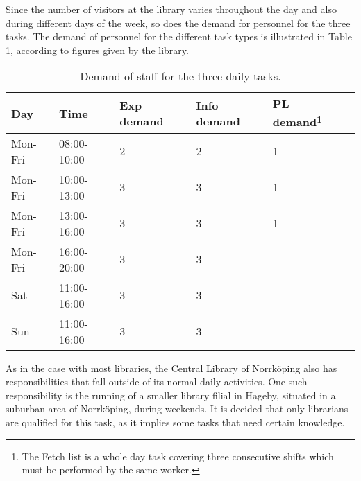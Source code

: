 Since the number of visitors at the library varies throughout the day and also during different days of the week, so does the demand for personnel for the three tasks. The demand of personnel for the different task types is illustrated in Table \ref{tab:Outer_Task_Demand}, according to figures given by the library. 



\begin{table}[h]
\centering
\caption{Demand of staff for the three daily tasks.}
\label{tab:Outer_Task_Demand}
\begin{tabularx}{\textwidth}{|X|l|l|l|l|X|}
\hline
\textbf{Day} & \textbf{Time} & \textbf{Exp demand} & \textbf{Info demand} & \textbf{PL demand\footnote{The Fetch list is a whole day task covering three consecutive shifts which must be performed by the same worker.}}
\\ \hline 
Mon-Fri & 08:00-10:00 & 2 & 2 & 1
\\ \hline 
Mon-Fri & 10:00-13:00 & 3 & 3 & 1
\\ \hline 
Mon-Fri & 13:00-16:00  & 3 & 3 & 1
\\ \hline 
Mon-Fri & 16:00-20:00 & 3 & 3 & -
\\ \hline 
Sat & 11:00-16:00  & 3 & 3 & -
\\ \hline 
Sun & 11:00-16:00  & 3 & 3 & -
\\ \hline 
\end{tabularx}

\end{table} 

As in the case with most libraries, the Central Library of Norrköping also has responsibilities that fall outside of its normal daily activities. One such responsibility is the running of a smaller library filial in Hageby, situated in a suburban area of Norrköping, during weekends. It is decided that only librarians are qualified for this task, as it implies some tasks that need certain knowledge.

